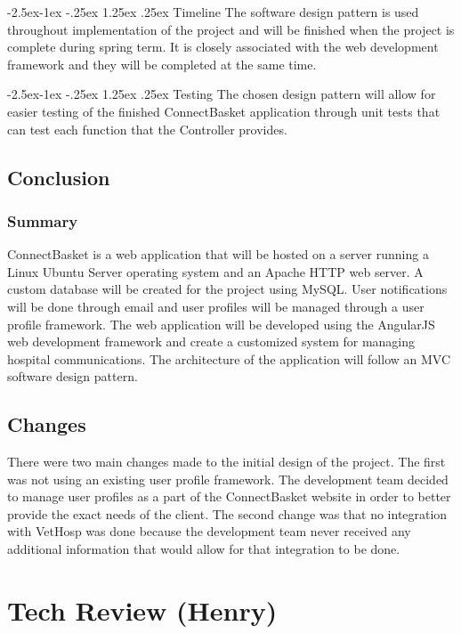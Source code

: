 \documentclass[onecolumn, draftclsnofoot,10pt, compsoc]{IEEEtran}
\makeatletter
\renewcommand\paragraph{\@startsection{paragraph}{4}{\z@}%
            {-2.5ex\@plus -1ex \@minus -.25ex}%
            {1.25ex \@plus .25ex}%
            {\normalfont\normalsize\bfseries}}
\makeatother
\begin{document}
\paragraph{Timeline}
The software design pattern is used throughout implementation of the project and will be finished when the project is complete during spring term. It is closely associated with the web development framework and they will be completed at the same time.


\paragraph{Testing}
The chosen design pattern will allow for easier testing of the finished ConnectBasket application through unit tests that can test each function that the Controller provides.


\subsection{Conclusion}

\subsubsection{Summary}
ConnectBasket is a web application that will be hosted on a server running a Linux Ubuntu Server operating system and an Apache HTTP web server. A custom database will be created for the project using MySQL. User notifications will be done through email and user profiles will be managed through a user profile framework. The web application will be developed using the AngularJS web development framework and create a customized system for managing hospital communications. The architecture of the application will follow an MVC software design pattern.

\subsection{Changes}
There were two main changes made to the initial design of the project. The first was not using an existing user profile framework. The development team decided to manage user profiles as a part of the ConnectBasket website in order to better provide the exact needs of the client. The second change was that no integration with VetHosp was done because the development team never received any additional information that would allow for that integration to be done.

\newpage
\section{Tech Review (Henry)}
\end{document}
